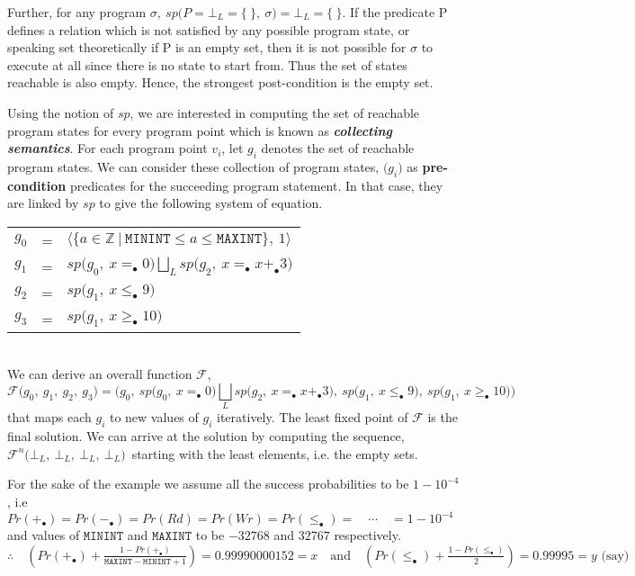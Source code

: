 \documentclass[final,3p, review, times]{util/elsarticle}
\begin{document}
Further, for any program $\sigma,\ sp\big(P = \bot_L = \{\ \},\ \sigma\big) = \bot_L= \{\ \}$. If the predicate P defines a relation which is not satisfied by any possible program state, or speaking set theoretically if P is an empty set, then it is not possible for $\sigma$ to execute at all since there is no state to start from. Thus the set of states reachable is also empty. Hence, the strongest post-condition is the empty set.

Using the notion of $sp$, we are interested in computing the set of reachable program states for every program point which is known as \textbf{\textit{collecting semantics}}. For each program point $v_i$, let $g_i$ denotes the set of reachable program states. We can consider these collection of program states, $\big(g_i\big)$ as \textbf{pre-condition} predicates for the succeeding program statement. In that case, they are linked by $sp$ to give the following system of equation.

\begin{tabular}{lcl}
$g_0$ & = & $\Big\langle\Big\{a\in\mathbb{Z}\ \big|\ \mathtt{MININT}\leq a\leq\mathtt{MAXINT}\Big\},\ 1\Big\rangle$ \\
$g_1$ & = & $\displaystyle sp\big(g_0,\ x =_\bullet 0\big)\bigsqcup_L sp\big(g_2,\ x =_\bullet x +_\bullet 3\big)$ \\
$g_2$ & = & $sp\big(g_1,\ x \leq_\bullet9\big)$ \\
$g_3$ & = & $sp\big(g_1,\ x \geq_\bullet10\big)$ \\
\end{tabular}\\

We can derive an overall function $\mathcal{F}$,
$$\mathcal{F}\big(g_0,\ g_1,\ g_2,\ g_3\big) = \Big(g_0,\ sp\big(g_0,\ x =_\bullet 0\big)\bigsqcup_L sp\big(g_2,\ x =_\bullet x +_\bullet 3\big),\ sp\big(g_1,\ x \leq_\bullet 9\big),\ sp\big(g_1,\ x \geq_\bullet 10\big)\Big)$$
that maps each $g_i$ to new values of $g_i$ iteratively. The least fixed point of $\mathcal{F}$ is the final solution. We can arrive at the solution by computing the sequence, $\mathcal{F}^n\big(\bot_L,\ \bot_L,\ \bot_L,\ \bot_L\big)$\ starting with the least elements, i.e. the empty sets.

For the sake of the example we assume all the success probabilities to be $1-10^{-4}$, i.e $Pr(+_\bullet)=Pr(-_\bullet)=Pr(Rd)=Pr(Wr)=Pr(\leq_\bullet)=\quad\cdots\quad=1-10^{-4}$ and values of $\mathtt{MININT}$ and $\mathtt{MAXINT}$ to be $-32768$ and $32767$ respectively. $\therefore\displaystyle\quad\left(Pr(+_\bullet)+\frac{1-Pr(+_\bullet)}{\mathtt{MAXINT}-\mathtt{MININT}+1}\right)=0.99990000152=x\quad\text{and}\quad\left(Pr(\leq_\bullet)+\frac{1-Pr(\leq_\bullet)}{2}\right)=0.99995=y\text{ (say)}$\\
\end{document}
